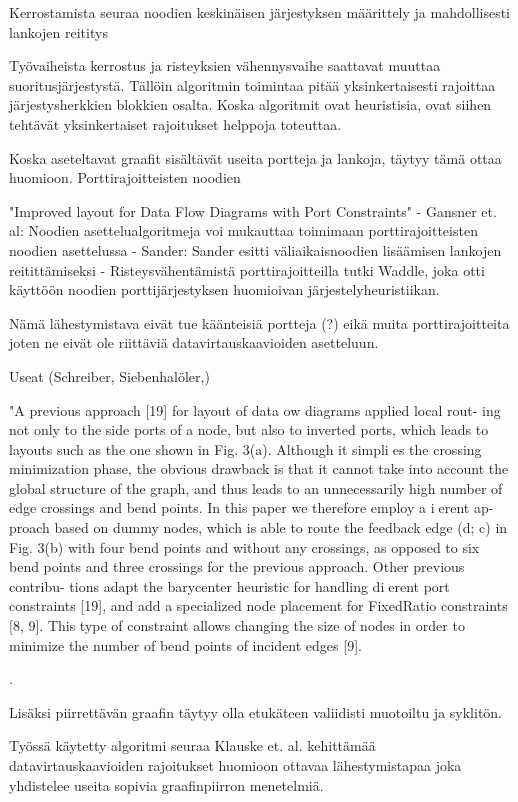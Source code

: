 \documentclass[finnish,12pt]{article}
\begin{document}
Kerrostamista seuraa noodien keskinäisen järjestyksen määrittely ja mahdollisesti lankojen reititys

Työvaiheista kerrostus ja risteyksien vähennysvaihe saattavat muuttaa suoritusjärjestystä.
Tällöin algoritmin toimintaa pitää yksinkertaisesti rajoittaa järjestysherkkien blokkien osalta.
Koska algoritmit ovat heuristisia, ovat siihen tehtävät yksinkertaiset rajoitukset helppoja toteuttaa.

Koska aseteltavat graafit sisältävät useita portteja ja lankoja, täytyy tämä ottaa huomioon. Porttirajoitteisten noodien

"Improved layout for Data Flow Diagrams with Port Constraints"
- Gansner et. al: Noodien asettelualgoritmeja voi mukauttaa toimimaan porttirajoitteisten noodien asettelussa
- Sander: Sander esitti väliaikaisnoodien lisäämisen lankojen reitittämiseksi
- Risteysvähentämistä porttirajoitteilla tutki Waddle, joka otti käyttöön noodien porttijärjestyksen huomioivan järjestelyheuristiikan.

Nämä lähestymistava eivät tue käänteisiä portteja (?) eikä muita porttirajoitteita joten ne eivät ole riittäviä datavirtauskaavioiden asetteluun.

Useat (Schreiber, Siebenhalöler,)

"A previous approach [19] for layout of data  ow diagrams applied local rout- ing not only to the side ports of a node, but also to inverted ports, which leads to layouts such as the one shown in Fig. 3(a). Although it simplies the crossing minimization phase, the obvious drawback is that it cannot take into account the global structure of the graph, and thus leads to an unnecessarily high number of edge crossings and bend points. In this paper we therefore employ a  ierent ap- proach based on dummy nodes, which is able to route the feedback edge (d; c) in Fig. 3(b) with four bend points and without any crossings, as opposed to six bend points and three crossings for the previous approach. Other previous contribu- tions adapt the barycenter heuristic for handling dierent port constraints [19], and add a specialized node placement for FixedRatio constraints [8, 9]. This type of constraint allows changing the size of nodes in order to minimize the number of bend points of incident edges [9].

\cite{RefWorks:28}.

Lisäksi piirrettävän graafin täytyy olla etukäteen valiidisti muotoiltu ja syklitön.

Työssä käytetty algoritmi seuraa Klauske et. al. kehittämää  datavirtauskaavioiden rajoitukset huomioon ottavaa lähestymistapaa \cite{RefWorks:50} joka yhdistelee useita sopivia graafinpiirron menetelmiä.
\end{document}
